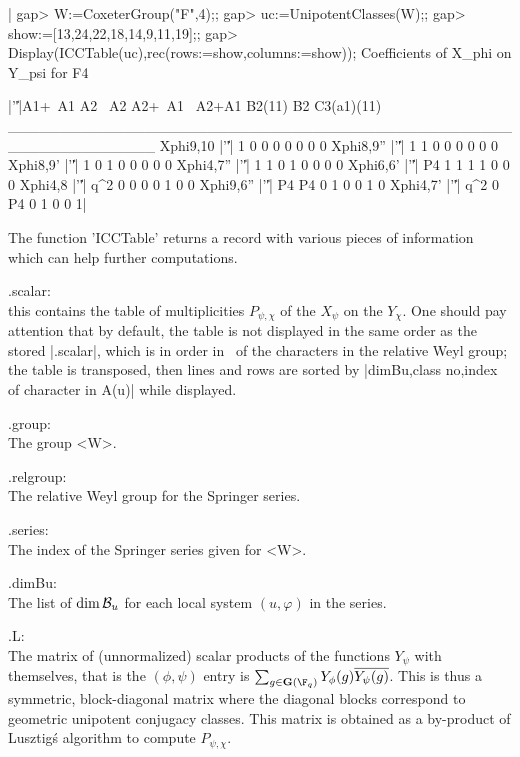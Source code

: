 |    gap> W:=CoxeterGroup("F",4);;
    gap> uc:=UnipotentClasses(W);;
    gap> show:=[13,24,22,18,14,9,11,19];;
    gap> Display(ICCTable(uc),rec(rows:=show,columns:=show));
    Coefficients of X_phi on Y_psi for F4

                |'\|'|A1+~A1 A2 ~A2 A2+~A1 ~A2+A1 B2(11) B2 C3(a1)(11)
    ______________________________________________________________
    Xphi{9,10}  |'\|'|     1  0   0      0      0      0  0          0
    Xphi{8,9}'' |'\|'|     1  1   0      0      0      0  0          0
    Xphi{8,9}'  |'\|'|     1  0   1      0      0      0  0          0
    Xphi{4,7}'' |'\|'|     1  1   0      1      0      0  0          0
    Xphi{6,6}'  |'\|'|    P4  1   1      1      1      0  0          0
    Xphi{4,8}   |'\|'|   q^2  0   0      0      0      1  0          0
    Xphi{9,6}'' |'\|'|    P4 P4   0      1      0      0  1          0
    Xphi{4,7}'  |'\|'|   q^2  0  P4      0      1      0  0          1|

The function 'ICCTable' returns a record with various pieces of information
which can help further computations.

.scalar:\\ this contains the table of multiplicities $P_{\psi,\chi}$ of the
$X_\psi$  on the  $Y_\chi$. One  should pay  attention that by default, the
table  is not displayed in the same order as the stored |.scalar|, which is
in  order in  \CHEVIE\ of  the characters  in the  relative Weyl group; the
table  is  transposed,  then  lines  and  rows  are  sorted by |dimBu,class
no,index of character in A(u)| while displayed.

.group:\\ The group <W>.

.relgroup:\\ The relative Weyl group for the Springer series.

.series:\\ The index of the Springer series given for <W>.

.dimBu:\\  The list of  $\dim{\mathcal B}_u$ for each  local system $(u,\varphi)$ in
the series.

.L:\\  The  matrix  of  (unnormalized)  scalar  products  of  the functions
$Y_\psi$   with   themselves,   that   is   the   $(\phi,\psi)$   entry  is
$\sum_{g\in\bG(\F_q)}  Y_\phi(g)  \overline{Y_\psi(g)}$.  This  is  thus  a
symmetric,  block-diagonal matrix  where the  diagonal blocks correspond to
geometric  unipotent  conjugacy  classes.  This  matrix  is  obtained  as a
by-product of Lusztig\'s algorithm to compute $P_{\psi,\chi}$.


